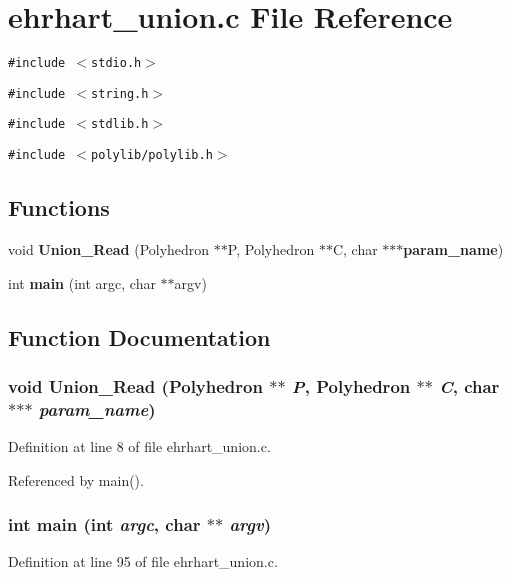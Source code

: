 \section{ehrhart\_\-union.c File Reference}
\label{ehrhart__union_8c}
{\tt \#include $<$stdio.h$>$}\par
{\tt \#include $<$string.h$>$}\par
{\tt \#include $<$stdlib.h$>$}\par
{\tt \#include $<$polylib/polylib.h$>$}\par
\subsection*{Functions}
\begin{CompactItemize}
\item 
void {\bf Union\_\-Read} (Polyhedron $\ast$$\ast$P, Polyhedron $\ast$$\ast$C, char $\ast$$\ast$$\ast${\bf param\_\-name})
\item 
int {\bf main} (int argc, char $\ast$$\ast$argv)
\end{CompactItemize}


\subsection{Function Documentation}
\subsubsection{\setlength{\rightskip}{0pt plus 5cm}void Union\_\-Read (Polyhedron $\ast$$\ast$ {\em P}, Polyhedron $\ast$$\ast$ {\em C}, char $\ast$$\ast$$\ast$ {\em param\_\-name})}\label{ehrhart__union_8c_a0}




Definition at line 8 of file ehrhart\_\-union.c.

Referenced by main().

\subsubsection{\setlength{\rightskip}{0pt plus 5cm}int main (int {\em argc}, char $\ast$$\ast$ {\em argv})}\label{ehrhart__union_8c_a1}




Definition at line 95 of file ehrhart\_\-union.c.